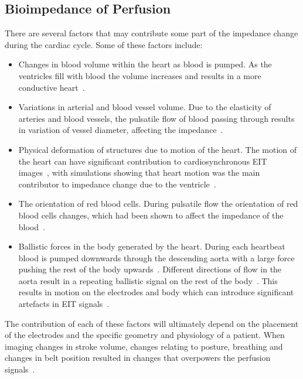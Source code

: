 \subsection{Bioimpedance of Perfusion}
There are several factors that may contribute some part of 
the impedance change during the cardiac cycle. 
Some of these factors include:
\begin{itemize}
    \item Changes in blood volume within the heart as blood is pumped. As the ventricles 
          fill with blood
          the volume increases and results in a more conductive
          heart~\parencite{nyboer_impedance_1970}.
    \item Variations in arterial and blood vessel volume. Due to the elasticity of arteries 
          and
          blood vessels, the pulsatile flow of blood passing through results in variation of 
          vessel diameter, affecting the impedance~\parencite{eyuboglu_localisation_1987}.
    \item Physical deformation of structures due to motion of the heart. The
          motion of the heart can have significant contribution 
          to cardiosynchronous EIT 
          images~\parencite{proenca_influence_2015,adler_origins_2017}, 
          with simulations showing that heart motion was the 
          main contributor to impedance change due to the 
          ventricle~\parencite{proenca_influence_2015}. 
    \item The orientation of red blood cells. During pulsatile flow the orientation of
          red blood cells changes, which had been shown to affect the impedance of the 
          blood~\parencite{gaw_effect_2010}. 
    \item Ballistic forces in the body generated by the heart. During each
          heartbeat blood is pumped downwards through the descending
          aorta with a large force pushing the rest of the body 
          upwards~\parencite{gordon_certain_1877}. Different directions 
          of flow in the aorta result in a repeating ballistic 
          signal on the rest of the body~\parencite{kim_ballistocardiogram_2016}. This results in 
          motion on the electrodes and body which can introduce significant
          artefacts in EIT signals~\parencite{adler_impedance_1994}.
\end{itemize}

The contribution of each of these factors will ultimately depend on the placement
of the electrodes and the specific geometry and physiology of a patient. 
When imaging changes in stroke volume, changes 
relating to posture, breathing and changes in belt 
position resulted in  changes that overpowers the 
perfusion signals~\parencite{patterson_variability_2001}.  

